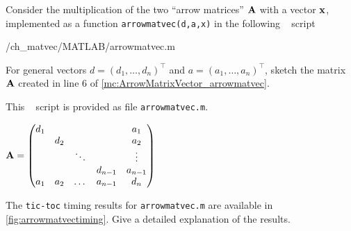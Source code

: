 
\renewcommand{\chpt}{ch_matvec}

\begin{problem} \label{prb:ArrowMatrixVector}

Consider the multiplication of the two ``arrow matrices'' ${\mathbf{A}}$ with a vector ${\mathbf{x}}$,
implemented as a function \texttt{arrowmatvec(d,a,x)} in the following \Matlab~ script
%

{\problems/\chpt/MATLAB/arrowmatvec.m}
%


\begin{subproblem}[1] \label{subprb:ArrowMatrixVector_1}
For general vectors $d = (d_1, \dots, d_n)^\top$ and $a = (a_1, \dots, a_n)^\top$, sketch the matrix ${\mathbf{A}}$  created in line 6 of \autoref{mc:ArrowMatrixVector_arrowmatvec}.

\begin{hint}
This \Matlab~ script is provided as file \texttt{arrowmatvec.m}.
\end{hint}

\begin{solution}
${\mathbf{A}}=\begin{pmatrix}
         d_1 &     &        &         &  a_1     \\
             & d_2 &        &         &  a_2     \\
             &     & \ddots &         &  \vdots  \\
             &     &        & d_{n-1} &  a_{n-1} \\
         a_1 & a_2 & \dots  & a_{n-1} &  d_n     \\
 \end{pmatrix}$
\end{solution}
\end{subproblem}


\begin{subproblem}[2] \label{subprb:ArrowMatrixVector_2}
The \texttt{tic-toc} timing results for \texttt{arrowmatvec.m} are available in
\autoref{fig:arrowmatvectiming}.  Give a detailed explanation of the results.


\end{subproblem}
\end{problem}
